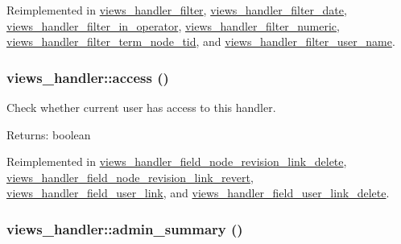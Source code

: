 Reimplemented in \hyperlink{classviews__handler__filter_88ccd2ef359009614abb48fb83c2a738}{views\_\-handler\_\-filter}, \hyperlink{classviews__handler__filter__date_063da758bf1832f38454620cbc94e304}{views\_\-handler\_\-filter\_\-date}, \hyperlink{classviews__handler__filter__in__operator_ff2b25941729b9ca81e1e53bb8e95a96}{views\_\-handler\_\-filter\_\-in\_\-operator}, \hyperlink{classviews__handler__filter__numeric_0fd6abb3062be32410bef3c1cefdaaf5}{views\_\-handler\_\-filter\_\-numeric}, \hyperlink{classviews__handler__filter__term__node__tid_75f38674ff356981f6e77f009da2101a}{views\_\-handler\_\-filter\_\-term\_\-node\_\-tid}, and \hyperlink{classviews__handler__filter__user__name_a6ae18031b13da1c92d83b8c5de74c15}{views\_\-handler\_\-filter\_\-user\_\-name}.\hypertarget{classviews__handler_3f2fbfe1e0849d06ae77149412b821f6}{
\subsubsection[{access}]{\setlength{\rightskip}{0pt plus 5cm}views\_\-handler::access ()}}
\label{classviews__handler_3f2fbfe1e0849d06ae77149412b821f6}


Check whether current user has access to this handler.

\begin{Desc}
\item[Returns:]boolean \end{Desc}


Reimplemented in \hyperlink{classviews__handler__field__node__revision__link__delete_8d1e660c4945e837ced26d6f12a6521e}{views\_\-handler\_\-field\_\-node\_\-revision\_\-link\_\-delete}, \hyperlink{classviews__handler__field__node__revision__link__revert_6cb6e683478e55b9e3e64602dbc8886d}{views\_\-handler\_\-field\_\-node\_\-revision\_\-link\_\-revert}, \hyperlink{classviews__handler__field__user__link_00708207b597556c70cba91816a03963}{views\_\-handler\_\-field\_\-user\_\-link}, and \hyperlink{classviews__handler__field__user__link__delete_2b7406dc052b9c2a6970ac45344c6635}{views\_\-handler\_\-field\_\-user\_\-link\_\-delete}.\hypertarget{classviews__handler_27a5cb35f3f17322957730a95b6be11e}{
\subsubsection[{admin\_\-summary}]{\setlength{\rightskip}{0pt plus 5cm}views\_\-handler::admin\_\-summary ()}}
\label{classviews__handler_27a5cb35f3f17322957730a95b6be11e}


